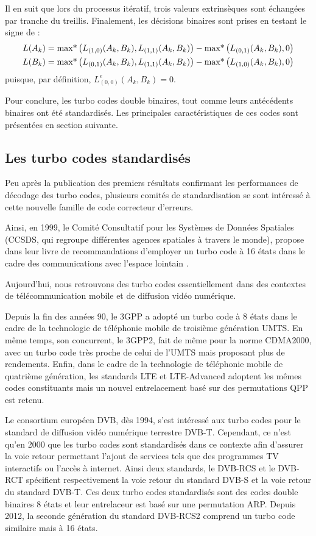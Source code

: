 Il en suit que lors du processus itératif, trois valeurs extrinsèques sont échangées par tranche du treillis.
Finalement, les décisions binaires sont prises en testant le signe de : 
\begin{align*}
	L(A_k) & = \operatorname*{max*} \left(L_{(1,0)}(A_k,B_k),L_{(1,1)}(A_k,B_k)\right) - \operatorname*{max*} \left(L_{(0,1)}(A_k,B_k),0\right) \\
	L(B_k) & = \operatorname*{max*} \left(L_{(0,1)}(A_k,B_k),L_{(1,1)}(A_k,B_k)\right) - \operatorname*{max*} \left(L_{(1,0)}(A_k,B_k),0\right) 
\end{align*}
puisque, par définition, $L^e_{(0,0)}(A_k,B_k)=0$.

Pour conclure, les turbo codes double binaires, tout comme leurs antécédents binaires ont été standardisés. Les principales caractéristiques de ces codes sont présentées en section suivante.

\subsection{Les turbo codes standardisés}
Peu après la publication des premiers résultats confirmant les performances de décodage des turbo codes, plusieurs comités de standardisation se sont intéressé à cette nouvelle famille de code correcteur d'erreurs.

Ainsi, en 1999, le Comité Consultatif pour les Systèmes de Données Spatiales (CCSDS, qui regroupe différentes agences spatiales à travers le monde), propose dans leur livre de recommandations d'employer un turbo code à 16 états dans le cadre des communications avec l'espace lointain \cite{ccsdsBluebook}. 

Aujourd'hui, nous retrouvons des turbo codes essentiellement dans des contextes de télécommunication mobile et de diffusion vidéo numérique.

Depuis la fin des années 90, le 3GPP a adopté un turbo code à 8 états dans le cadre de la technologie de téléphonie mobile de troisième génération UMTS. En même temps, son concurrent, le 3GPP2, fait de même pour la norme CDMA2000, avec un turbo code très proche de celui de l'UMTS mais proposant plus de rendements. 
Enfin, dans le cadre de la technologie de téléphonie mobile de quatrième génération, les standards LTE et LTE-Advanced \cite{lte} adoptent les mêmes codes constituants mais un nouvel entrelacement basé sur des permutations QPP est retenu.

Le consortium européen DVB, dès 1994, s'est intéressé aux turbo codes pour le standard de diffusion vidéo numérique terrestre DVB-T. Cependant, ce n'est qu'en 2000 que les turbo codes sont standardisés dans ce contexte afin d'assurer la voie retour permettant l'ajout de services tels que des programmes TV interactifs ou l’accès à internet. Ainsi deux standards, le DVB-RCS \cite{dvbrcs} et le DVB-RCT \cite{dvbrct} spécifient respectivement la voie retour du standard DVB-S et la voie retour du standard DVB-T. Ces deux turbo codes standardisés sont des codes double binaires 8 états et leur entrelaceur est basé sur une permutation ARP. Depuis 2012, la seconde génération du standard DVB-RCS2 \cite{dvbrcs2} comprend un turbo code similaire mais à 16 états.

